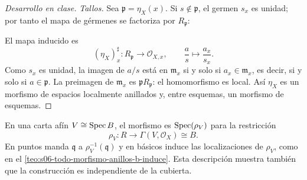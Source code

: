 \begin{proof}[Desarrollo en clase]
\emph{Tallos.} Sea $\mathfrak p=\eta_X(x)$. Si $s\notin\mathfrak p$, el germen $s_x$ es unidad; por tanto el mapa de gérmenes se factoriza por $R_{\mathfrak p}$:
\nopagebreak
\begin{center}
\end{center}
El mapa inducido es
\[
(\eta_X)_x^\sharp\colon R_{\mathfrak p}\longrightarrow\mathcal O_{X,x},
\qquad \frac{a}{s}\longmapsto\frac{a_x}{s_x}.
\]
Como $s_x$ es unidad, la imagen de $a/s$ está en $\mathfrak m_x$ si y solo si $a_x\in\mathfrak m_x$, es decir, si y solo si $a\in\mathfrak p$. La preimagen de $\mathfrak m_x$ es $\mathfrak pR_{\mathfrak p}$: el homomorfismo es local. Así $\eta_X$ es un morfismo de espacios localmente anillados y, entre esquemas, un morfismo de esquemas.
\end{proof}

En una carta afín $V\cong\operatorname{Spec} B$, el morfismo es $\operatorname{Spec}(\rho_V)$ para la restricción
\[
\rho_V\colon R\longrightarrow\Gamma(V,\mathcal O_X)\cong B.
\]
En puntos manda $\mathfrak q$ a $\rho_V^{-1}(\mathfrak q)$ y en básicos induce las localizaciones de $\rho_V$, como en el \cref{teo:s06-todo-morfismo-anillos-b-induce}. Esta descripción muestra también que la construcción es independiente de la cubierta.

